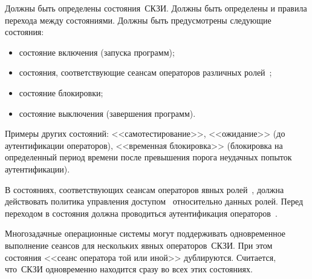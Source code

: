 \label{R.AC.States}
Должны быть определены состояния~СКЗИ. Должны быть определены и 
 правила 
перехода между состояниями. Должны быть предусмотрены следующие состояния:
\begin{itemize}
\item
состояние включения (запуска программ);
\item
состояния, соответствующие сеансам операторов различных ролей~;
\item
состояние блокировки;
\item
состояние выключения (завершения программ).
\end{itemize}

\begin{note}
Примеры других состояний:
<<самотестирование>>,
<<ожидание>> (до аутентификации операторов),
<<временная блокировка>> (блокировка на определенный период времени
после превышения порога неудачных попыток аутентификации).
\end{note}

\label{R.AC.OpStates}
В состояниях, соответствующих сеансам операторов явных
ролей~, должна действовать политика управления 
доступом~ относительно данных ролей.
%
Перед переходом в состояния должна проводиться аутентификация
операторов~.

\begin{note}
Многозадачные операционные системы могут поддерживать 
одновременное выполнение сеансов для нескольких явных операторов~СКЗИ.
При этом состояния <<сеанс оператора той или иной>> дублируются. 
Считается, что~СКЗИ одновременно находится сразу во всех этих состояниях. 

\end{note}

